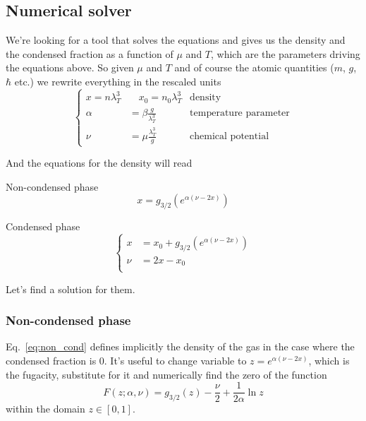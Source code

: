 \documentclass{article}
\begin{document}
\subsection*{Numerical solver}
We're looking for a tool \cite{hfsolver} that solves the equations and gives us the density and the condensed fraction as a function of $\mu$ and $T$, which are the parameters driving the equations above. So given $\mu$ and $T$ and of course the atomic quantities ($m$, $g$, $\hbar$ etc.) we rewrite everything in the rescaled units
\begin{equation}
\left\{
\begin{aligned}
  x = n \lambda_T^3 &\quad  x_0 = n_0 \lambda_T^3  &\text{density}\\
  \alpha &= \beta\frac{g}{\lambda_T^3}  &\text{temperature parameter}\\
  \nu &= \mu \frac{\lambda_T^3}{g} &\text{chemical potential}
\end{aligned}\right.
\end{equation}

And the equations for the density will read
~\\

\begin{minipage}[t]{0.5\textwidth}
\centering
Non-condensed phase
\begin{equation}\label{eq:non_cond}
    x = g_{3/2}(e^{\alpha(\nu - 2x)})
\end{equation}

\end{minipage}%
\begin{minipage}[t]{0.5\textwidth}
\centering
Condensed phase
\begin{equation}\label{eq:cond}
  \left\{
  \begin{aligned}
    x &= x_0 + g_{3/2}(e^{\alpha(\nu - 2x)}) \\
    \nu &= 2x - x_0 \\
  \end{aligned}\right.
\end{equation}
\end{minipage}

Let's find a solution for them.

\subsubsection*{Non-condensed phase}
Eq.~\ref{eq:non_cond} defines implicitly the density of the gas in the case where the condensed fraction is 0. It's useful to change variable to $z = e^{\alpha(\nu - 2x)}$, which is the fugacity, substitute for it and numerically find the zero of the function
\begin{equation}
  F(z; \alpha, \nu) = g_{3/2}(z) - \frac{\nu}{2} + \frac{1}{2\alpha}\ln z
\end{equation}
within the domain $z \in [0, 1]$.
\end{document}
